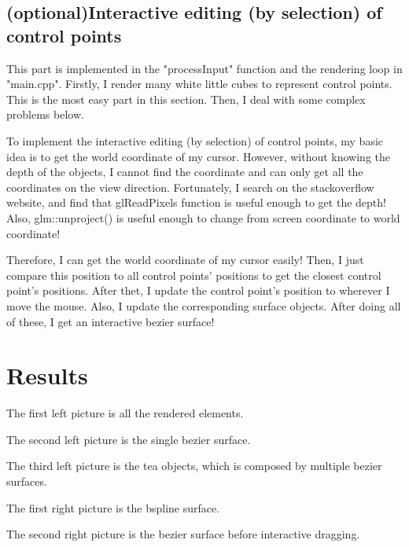 \documentclass[acmtog]{acmart}
\begin{document}
\subsection{(optional)Interactive editing (by selection) of control points}
\quad This part is implemented in the "processInput" function and the rendering loop in "main.cpp". 
Firstly, I render many white little cubes to represent control points. This is the most easy part in this section. Then, I deal with some complex problems below. 

To implement the interactive editing (by selection) of control points,
my basic idea is to get the world coordinate of my cursor. However, without knowing the depth of the objects, I cannot find the coordinate and can only get all the coordinates on the view direction. 
Fortunately, I search on the stackoverflow website, and find that glReadPixels function is useful enough to get the depth! Also, glm::unproject() is useful enough to change from screen coordinate to world coordinate!

Therefore, I can get the world coordinate of my cursor easily! 
Then, I just compare this position to all control points' positions to get the closest control point's positions.
After thet, I update the control point's position to wherever I move the mouse. Also, I update the corresponding surface objects.
After doing all of these, I get an interactive bezier surface!
\section{Results}
\quad The first left picture is all the rendered elements.

The second left picture is the single bezier surface.

The third left picture is the tea objects, which is composed by multiple bezier surfaces.


The first right picture is the bspline surface.

The second right picture is the bezier surface before interactive dragging.
\end{document}
